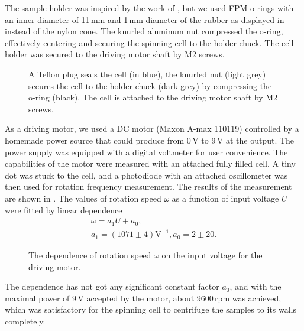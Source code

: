 The sample holder was inspired by the work of
\textcite{Shriver1974},
but we used FPM o-rings with an inner diameter of 11\,mm and 1\,mm diameter of
the rubber as displayed in
instead of the nylon cone.
The knurled aluminum nut compressed the o-ring, effectively centering and
securing the spinning cell to the holder chuck.
The cell holder was secured to the driving motor shaft by M2 screws.

\begin{figure}
	\centering
	
	\caption[%
		Spinning cell holder.%
	]{%
		A Teflon plug seals the cell (in blue), the knurled nut (light grey)
		secures the cell to the holder chuck (dark grey) by compressing the o-ring
		(black).
		The cell is attached to the driving motor shaft by M2 screws.
	}
	\label{\figlabel{spinning_cell:drawing}}
\end{figure}

As a driving motor, we used a DC motor (Maxon A-max 110119) controlled by a
homemade power source that could produce from 0\,V to 9\,V at the output.
The power supply was equipped with a digital voltmeter for user convenience.
The capabilities of the motor were measured with an attached fully filled cell.
A tiny dot was stuck to the cell, and a photodiode with an attached
oscillometer was then used for rotation frequency measurement.
The results of the measurement are shown in
.
The values of rotation speed $\omega$ as a function of input voltage $U$ were
fitted by linear dependence
\begin{gather*}
	\omega = a_1U + a_0,\\
	a_1 = (1071 \pm 4) \text{V}^{-1}, a_0 = 2 \pm 20.
\end{gather*}

\begin{figure}
	\centering
	
	\caption[%
		Spinning cell rotation evaluation.%
	]{%
		The dependence of rotation speed $\omega$ on the input voltage for the
		driving motor.
	}
	\label{\figlabel{spinning_cell:rotation}}
\end{figure}

The dependence has not got any significant constant factor $a_0$, and with the
maximal power of 9\,V accepted by the motor, about 9600\,rpm was achieved,
which was satisfactory for the spinning cell to centrifuge the samples to its
walls completely.
